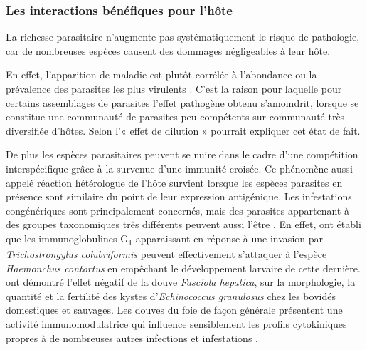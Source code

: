\subsubsection{Les interactions bénéfiques pour l'hôte}
La richesse parasitaire n'augmente pas systématiquement le risque de pathologie, 
car de nombreuses espèces causent des dommages négligeables à leur hôte. 
\par En effet, l'apparition de maladie est plutôt corrélée à l'abondance ou la 
prévalence des parasites les plus virulents . C'est la raison pour 
laquelle pour certains assemblages de parasites l'effet pathogène obtenu s'amoindrit, 
lorsque se constitue une communauté de parasites peu compétents sur communauté très 
diversifiée d'hôtes. Selon  l'« effet de dilution » pourrait expliquer 
cet état de fait.
\par De plus les espèces parasitaires peuvent se nuire dans le cadre d'une compétition 
interspécifique grâce à la survenue d'une immunité croisée. Ce phénomène aussi appelé 
réaction hétérologue de l'hôte survient lorsque les espèces parasites en présence sont 
similaire du point de leur expression antigénique. Les infestations congénériques sont 
principalement concernés, mais des parasites appartenant à des groupes taxonomiques 
très différents peuvent aussi l'être . En effet,  ont 
établi que les immunoglobulines G\textsubscript{1} apparaissant en réponse à une 
invasion par \textit{Trichostrongylus colubriformis} peuvent effectivement s'attaquer 
à l'espèce \textit{Haemonchus contortus} en empêchant le développement larvaire de 
cette dernière.  ont démontré l'effet négatif de la douve 
\textit{Fasciola hepatica}, sur la morphologie, la quantité et la fertilité des 
kystes d'\textit{Echinococcus granulosus} chez les bovidés domestiques et sauvages. 
Les douves du foie de façon générale présentent une activité immunomodulatrice qui 
influence sensiblement les profils cytokiniques propres à de nombreuses autres 
infections et infestations .

